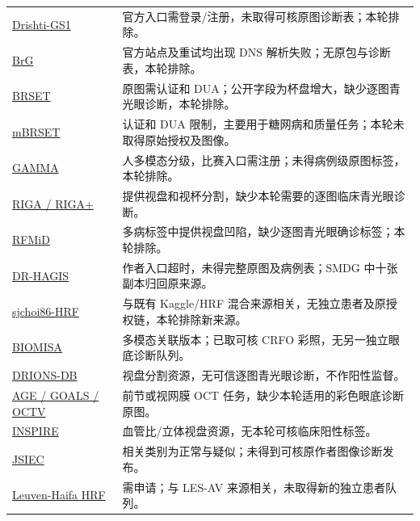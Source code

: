 \documentclass[
  10pt,
]{article}
\begin{document}
\begin{longtable}[]{@{}
  >{\raggedright\arraybackslash}p{}
  >{\raggedright\arraybackslash}p{}@{}}
\href{https://cvit.iiit.ac.in/projects/mip/drishti-gs/mip-dataset2/Download.php}{Drishti-GS1}
& 官方入口需登录/注册，未取得可核原图诊断表；本轮排除。 \\
\href{https://pmc.ncbi.nlm.nih.gov/articles/PMC9778370/}{BrG} &
官方站点及重试均出现 DNS 解析失败；无原包与诊断表，本轮排除。 \\
\href{https://physionet.org/content/brazilian-ophthalmological/1.0.2/}{BRSET}
& 原图需认证和
DUA；公开字段为杯盘增大，缺少逐图青光眼诊断，本轮排除。 \\
\href{https://physionet.org/content/mbrset/1.0/}{mBRSET} & 认证和 DUA
限制，主要用于糖网病和质量任务；本轮未取得原始授权及图像。 \\
\href{https://gamma.grand-challenge.org/}{GAMMA} & 300
人多模态分级，比赛入口需注册；未得病例级原图标签，本轮排除。 \\
\href{https://deepblue.lib.umich.edu/data/concern/data_sets/3b591905z}{RIGA
/ RIGA+} & 提供视盘和视杯分割，缺少本轮需要的逐图临床青光眼诊断。 \\
\href{https://doi.org/10.3390/data6020014}{RFMiD} &
多病标签中提供视盘凹陷，缺少逐图青光眼确诊标签；本轮排除。 \\
\href{https://personalpages.manchester.ac.uk/staff/niall.p.mcloughlin/}{DR-HAGIS}
& 作者入口超时，未得完整原图及病例表；SMDG 中十张副本归回原来源。 \\
\href{https://github.com/yiweichen04/retina_dataset}{sjchoi86-HRF} &
与既有 Kaggle/HRF
混合来源相关，无独立患者及原授权链，本轮排除新来源。 \\
\href{https://data.mendeley.com/datasets/2rnnz5nz74/2}{BIOMISA} &
多模态关联版本；已取可核 CRFO 彩照，无另一独立眼底诊断队列。 \\
\href{https://www.researchgate.net/publication/326460478_Glaucoma_dataset_-_DRIONS-DB}{DRIONS-DB}
& 视盘分割资源，无可信逐图青光眼诊断，不作阳性监督。 \\
\href{https://age.grand-challenge.org/Download/}{AGE / GOALS / OCTV} &
前节或视网膜 OCT 任务，缺少本轮适用的彩色眼底诊断原图。 \\
\href{https://medicine.uiowa.edu/eye/inspire-datasets}{INSPIRE} &
血管比/立体视盘资源，无本轮可核临床阳性标签。 \\
\href{https://www.kaggle.com/datasets/linchundan/fundusimage1000}{JSIEC}
& 相关类别为正常与疑似；未得到可核原作者图像诊断发布。 \\
\href{https://doi.org/10.48804/Z7SHGO}{Leuven-Haifa HRF} & 需申请；与
LES-AV 来源相关，未取得新的独立患者队列。 \\

\end{longtable}
\end{document}

